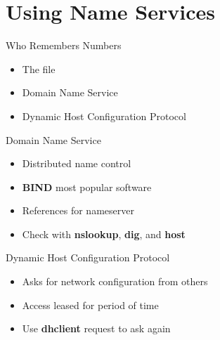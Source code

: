 \section{Using Name Services}

\begin{frame}
   {Who Remembers Numbers}
      \begin{itemize}
	      \item The  file
	 \item Domain Name Service
	 \item Dynamic Host Configuration Protocol
      \end{itemize}


\end{frame}

\cprotect\note{

}

\cprotect\note{

}
\begin{frame}
   {Domain Name Service}
      \begin{itemize}
         \item Distributed name control
	 \item \textbf{BIND} most popular software
	 \item References  for nameserver
	 \item Check with \textbf{nslookup}, \textbf{dig}, and \textbf{host}
      \end{itemize}


\end{frame}

\cprotect\note{

}
\begin{frame}
	{Dynamic Host Configuration Protocol}
      \begin{itemize}
         \item Asks for network configuration from others
	 \item Access leased for period of time
	 \item Use \textbf{dhclient} request to ask again
		 \begin{raw}
$ dhclient
		 \end{raw}
      \end{itemize}


\end{frame}

\cprotect\note{

}
